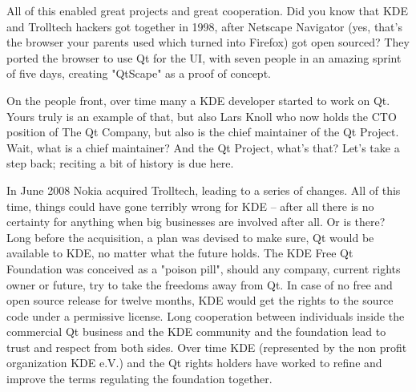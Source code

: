 All of this enabled great projects and great cooperation. Did you know that KDE and Trolltech hackers got together in 1998, after Netscape Navigator (yes, that’s the browser your parents used which turned into Firefox) got open sourced? They ported the browser to use Qt for the UI, with seven people in an amazing sprint of five days, creating "QtScape" as a proof of concept.

On the people front, over time many a KDE developer started to work on Qt. Yours truly is an example of that, but also Lars Knoll who now holds the CTO position of The Qt Company, but also is the chief maintainer of the Qt Project. Wait, what is a chief maintainer? And the Qt Project, what’s that? Let’s take a step back; reciting a bit of history is due here.

In June 2008 Nokia acquired Trolltech, leading to a series of changes. All of this time, things could have gone terribly wrong for KDE – after all there is no certainty for anything when big businesses are involved after all. Or is there? Long before the acquisition, a plan was devised to make sure, Qt would be available to KDE, no matter what the future holds. The KDE Free Qt Foundation was conceived as a "poison pill", should any company, current rights owner or future, try to take the freedoms away from Qt. In case of no free and open source release for twelve months, KDE would get the rights to the source code under a permissive license. Long cooperation between individuals inside the commercial Qt business and the KDE community and the foundation lead to trust and respect from both sides. Over time KDE (represented by the non profit organization KDE e.V.) and the Qt rights holders have worked to refine and improve the terms regulating the foundation together.

